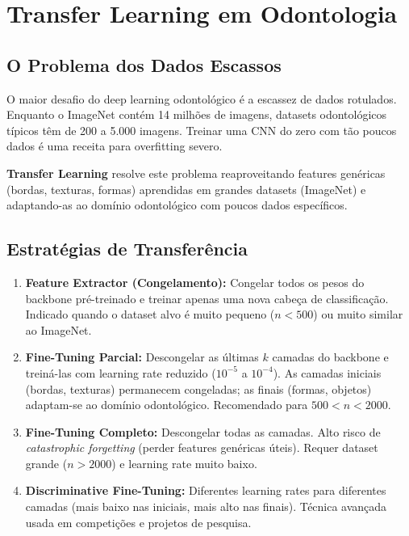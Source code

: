 \section{Transfer Learning em Odontologia}
\label{sec:transfer-learning}

\subsection{O Problema dos Dados Escassos}

O maior desafio do deep learning odontológico é a escassez de dados rotulados.
Enquanto o ImageNet contém 14 milhões de imagens, datasets odontológicos típicos
têm de 200 a 5.000 imagens. Treinar uma CNN do zero com tão poucos dados é uma
receita para overfitting severo.

\textbf{Transfer Learning} resolve este problema reaproveitando features genéricas
(bordas, texturas, formas) aprendidas em grandes datasets (ImageNet) e adaptando-as
ao domínio odontológico com poucos dados específicos.

\subsection{Estratégias de Transferência}

\begin{enumerate}
  \item \textbf{Feature Extractor (Congelamento):} Congelar todos os pesos do
        backbone pré-treinado e treinar apenas uma nova cabeça de classificação.
        Indicado quando o dataset alvo é muito pequeno ($n < 500$) ou muito similar
        ao ImageNet.

  \item \textbf{Fine-Tuning Parcial:} Descongelar as últimas $k$ camadas do backbone
        e treiná-las com learning rate reduzido ($10^{-5}$ a $10^{-4}$). As camadas
        iniciais (bordas, texturas) permanecem congeladas; as finais (formas,
        objetos) adaptam-se ao domínio odontológico. Recomendado para $500 < n < 2000$.

  \item \textbf{Fine-Tuning Completo:} Descongelar todas as camadas. Alto risco de
        \textit{catastrophic forgetting} (perder features genéricas úteis). Requer
        dataset grande ($n > 2000$) e learning rate muito baixo.

  \item \textbf{Discriminative Fine-Tuning:} Diferentes learning rates para
        diferentes camadas (mais baixo nas iniciais, mais alto nas finais).
        Técnica avançada usada em competições e projetos de pesquisa.
\end{enumerate}

